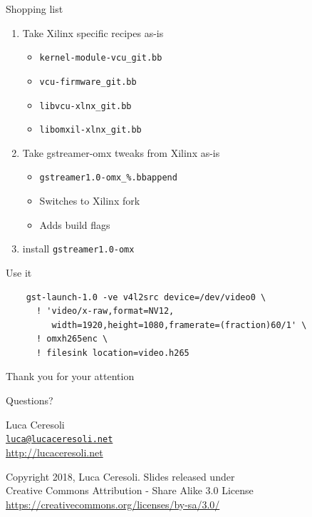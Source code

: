 \documentclass[xetex,table]{beamer}
\begin{document}
\begin{frame}{Shopping list}
  \begin{enumerate}
  \item Take Xilinx specific recipes as-is
    \begin{itemize}
    \item {\tt kernel-module-vcu\_git.bb}
    \item {\tt vcu-firmware\_git.bb}
    \item {\tt libvcu-xlnx\_git.bb}
    \item {\tt libomxil-xlnx\_git.bb}
    \end{itemize}
  \item Take gstreamer-omx tweaks from Xilinx as-is
    \begin{itemize}
    \item {\tt gstreamer1.0-omx\_\%.bbappend}
    \item Switches to Xilinx fork
    \item Adds build flags
    \end{itemize}
  \item install {\tt gstreamer1.0-omx}
  \end{enumerate}
\end{frame}

\begin{frame}[fragile]{Use it}
  \begin{verbatim}
    gst-launch-1.0 -ve v4l2src device=/dev/video0 \
      ! 'video/x-raw,format=NV12,
         width=1920,height=1080,framerate=(fraction)60/1' \
      ! omxh265enc \
      ! filesink location=video.h265
  \end{verbatim}
\end{frame}

\begin{frame}
  \begin{center}
    Thank you for your attention

    \vspace{0.15\textheight}

    {\Huge Questions?}

    \vspace{0.15\textheight}

    {\Large Luca Ceresoli}\\
    \href{mailto:luca@lucaceresoli.net}{\tt luca@lucaceresoli.net}\\
    \url{http://lucaceresoli.net}

    \vspace{0.05\textheight}

    \tiny
    \textcopyright{} Copyright 2018, Luca Ceresoli.
    Slides released under\\
    Creative Commons Attribution - Share Alike 3.0 License \\
    \url{https://creativecommons.org/licenses/by-sa/3.0/} \\
  \end{center}
\end{frame}
\end{document}
